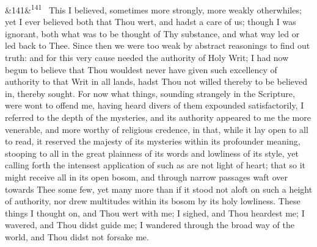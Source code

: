 \documentclass[12pt]{article}
\newcommand{\para}[1][]{\par\noindent\ifx&#1&\else\textsuperscript{\footnotesize #1}~\fi}
\begin{document}
\para[141] This I believed, sometimes more strongly, more weakly otherwhiles; yet I ever believed both that Thou wert, and hadst a care of us; though I was ignorant, both what was to be thought of Thy substance, and what way led or led back to Thee. Since then we were too weak by abstract reasonings to find out truth: and for this very cause needed the authority of Holy Writ; I had now begun to believe that Thou wouldest never have given such excellency of authority to that Writ in all lands, hadst Thou not willed thereby to be believed in, thereby sought. For now what things, sounding strangely in the Scripture, were wont to offend me, having heard divers of them expounded satisfactorily, I referred to the depth of the mysteries, and its authority appeared to me the more venerable, and more worthy of religious credence, in that, while it lay open to all to read, it reserved the majesty of its mysteries within its profounder meaning, stooping to all in the great plainness of its words and lowliness of its style, yet calling forth the intensest application of such as are not light of heart; that so it might receive all in its open bosom, and through narrow passages waft over towards Thee some few, yet many more than if it stood not aloft on such a height of authority, nor drew multitudes within its bosom by its holy lowliness. These things I thought on, and Thou wert with me; I sighed, and Thou heardest me; I wavered, and Thou didst guide me; I wandered through the broad way of the world, and Thou didst not forsake me.
\end{document}
